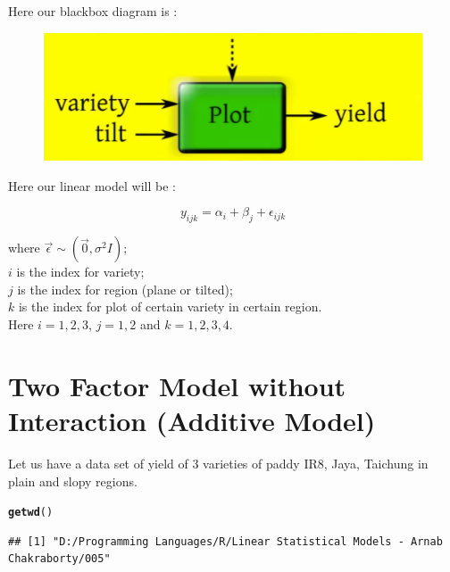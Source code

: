 \documentclass[11pt, a4paper]{article}\usepackage[]{graphicx}\usepackage[dvipsnames]{xcolor}
\makeatletter
\newcommand{\hlstd}[1]{\textcolor[rgb]{0.345,0.345,0.345}{#1}}%
\newcommand{\hlkwd}[1]{\textcolor[rgb]{0.737,0.353,0.396}{\textbf{#1}}}%
\newenvironment{kframe}{%
 \def\at@end@of@kframe{}%
 \ifinner\ifhmode%
  \def\at@end@of@kframe{\end{minipage}}%
  \begin{minipage}{\columnwidth}%
 \fi\fi%
 \def\FrameCommand##1{\hskip\@totalleftmargin \hskip-\fboxsep
 \colorbox{shadecolor}{##1}\hskip-\fboxsep
     \hskip-\linewidth \hskip-\@totalleftmargin \hskip\columnwidth}%
 \MakeFramed {\advance\hsize-\width
   \@totalleftmargin\z@ \linewidth\hsize
   \@setminipage}}%
 {\par\unskip\endMakeFramed%
 \at@end@of@kframe}
\newenvironment{knitrout}{}{} %
\makeatother
\begin{document}
Here our blackbox diagram is : 

\begin{figure}[h]
  \centering
  \includegraphics[scale = 0.5]{blackbox}
\end{figure}


Here our linear model will be : 

$$y_{ijk} = \alpha_i + \beta_j + \epsilon_{ijk}$$

where $\vec{\epsilon} \sim (\vec{0}, \sigma^2 I)$; \\

$i$ is the index for variety; \\

$j$ is the index for region (plane or tilted); \\

$k$ is the index for plot of certain variety in certain region. \\

Here $i = 1, 2, 3$, $j = 1, 2$ and $k = 1, 2, 3, 4$.

\section*{Two Factor Model without Interaction (Additive Model)}

Let us have a data set of yield of 3 varieties of paddy IR8, Jaya, Taichung in plain and slopy regions.

\begin{knitrout}
\color{fgcolor}\begin{kframe}
\begin{alltt}
\hlkwd{getwd}\hlstd{()}
\end{alltt}
\begin{verbatim}
## [1] "D:/Programming Languages/R/Linear Statistical Models - Arnab Chakraborty/005"
\end{verbatim}
\end{kframe}
\end{knitrout}
\end{document}
